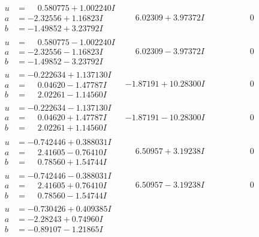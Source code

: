 \documentclass[1p]{elsarticle_modified}
\theoremstyle{definition}
\begin{document}
$$\begin{array}{c|c|c}
 \hline 
\begin{aligned}
u &= \phantom{-}0.580775 + 1.002240 I \\
a &= -2.32556 + 1.16823 I \\
b &= -1.49852 + 3.23792 I\end{aligned}
 & \phantom{-}6.02309 + 3.97372 I & \phantom{-0.000000 } 0 \\ \hline\begin{aligned}
u &= \phantom{-}0.580775 - 1.002240 I \\
a &= -2.32556 - 1.16823 I \\
b &= -1.49852 - 3.23792 I\end{aligned}
 & \phantom{-}6.02309 - 3.97372 I & \phantom{-0.000000 } 0 \\ \hline\begin{aligned}
u &= -0.222634 + 1.137130 I \\
a &= \phantom{-}0.04620 - 1.47787 I \\
b &= \phantom{-}2.02261 - 1.14560 I\end{aligned}
 & -1.87191 + 10.28300 I & \phantom{-0.000000 } 0 \\ \hline\begin{aligned}
u &= -0.222634 - 1.137130 I \\
a &= \phantom{-}0.04620 + 1.47787 I \\
b &= \phantom{-}2.02261 + 1.14560 I\end{aligned}
 & -1.87191 - 10.28300 I & \phantom{-0.000000 } 0 \\ \hline\begin{aligned}
u &= -0.742446 + 0.388031 I \\
a &= \phantom{-}2.41605 - 0.76410 I \\
b &= \phantom{-}0.78560 + 1.54744 I\end{aligned}
 & \phantom{-}6.50957 + 3.19238 I & \phantom{-0.000000 } 0 \\ \hline\begin{aligned}
u &= -0.742446 - 0.388031 I \\
a &= \phantom{-}2.41605 + 0.76410 I \\
b &= \phantom{-}0.78560 - 1.54744 I\end{aligned}
 & \phantom{-}6.50957 - 3.19238 I & \phantom{-0.000000 } 0 \\ \hline\begin{aligned}
u &= -0.730426 + 0.409385 I \\
a &= -2.28243 + 0.74960 I \\
b &= -0.89107 - 1.21865 I\end{aligned}

\end{array}$$
\end{document}
